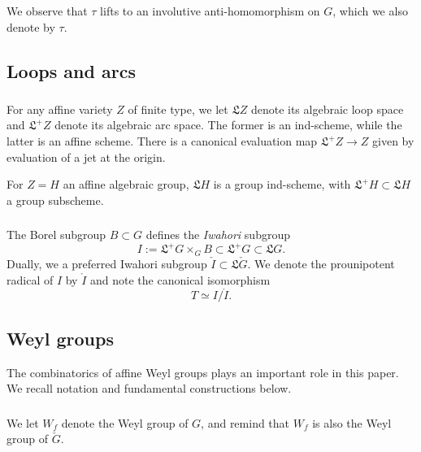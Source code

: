 \documentclass[11pt,reqno]{amsart}
\newcommand{\fL}{\mathfrak{L}}
\theoremstyle{remark}
\numberwithin{equation}{section}
\begin{document}
We observe that $\tau$ lifts to 
an involutive anti-homomorphism on $G$,
which we also denote by $\tau$.

\subsection{Loops and arcs}

\subsubsection{}

For any affine variety $Z$ of finite type, 
we let $\fL Z$ denote its algebraic loop space and
$\fL^+ Z$ denote its algebraic arc space. The former is
an ind-scheme, while the latter is an affine scheme. 
There is a canonical evaluation map $\fL^+ Z \to Z$ given by
evaluation of a jet at the origin.

For $Z = H$ an affine algebraic group, 
$\fL H$ is a group ind-scheme, with $\fL^+H \subset \fL H$ 
a group subscheme.
\subsubsection{}

The Borel subgroup $B \subset G$ defines the \emph{Iwahori}
subgroup \[I := \fL^+ G \times_G B \subset \fL^+ G \subset \fL G.\]
Dually, we a preferred Iwahori subgroup 
$\check{I} \subset \fL \check{G}$. We denote the prounipotent radical of $I$ by 
$\mathring{I}$ and note the canonical isomorphism 
%
\[
T \simeq I / \mathring{I}.
\]

\subsection{Weyl groups} 

The combinatorics of affine Weyl groups plays an important
role in this paper. We recall notation and fundamental
constructions below.

\subsubsection{}

We let $W_f$ denote the Weyl group of $G$, and remind that
$W_f$ is also the Weyl group of $\check{G}$. 

\subsubsection{}
\end{document}
